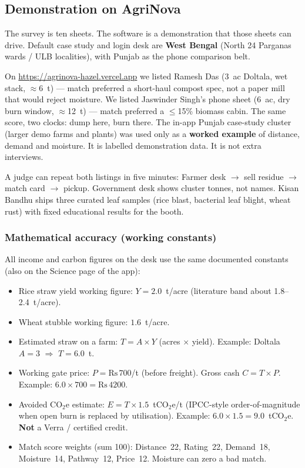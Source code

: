 \documentclass[12pt,a4paper]{article}
\begin{document}
\subsection{Demonstration on AgriNova}
The survey is ten sheets. The software is a demonstration that those sheets can drive. Default case study and login desk are \textbf{West Bengal} (North 24 Parganas wards / ULB localities), with Punjab as the phone comparison belt.

On \url{https://agrinova-hazel.vercel.app} we listed Ramesh Das (3~ac Doltala, wet stack, $\approx$6~t) --- match preferred a short-haul compost spec, not a paper mill that would reject moisture. We listed Jaswinder Singh's phone sheet (6~ac, dry burn window, $\approx$12~t) --- match preferred a $\le$15\% biomass cabin. The same score, two clocks: dump here, burn there. The in-app Punjab case-study cluster (larger demo farms and plants) was used only as a \textbf{worked example} of distance, demand and moisture. It is labelled demonstration data. It is not extra interviews.

A judge can repeat both listings in five minutes: Farmer desk $\rightarrow$ sell residue $\rightarrow$ match card $\rightarrow$ pickup. Government desk shows cluster tonnes, not names. Kisan Bandhu ships three curated leaf samples (rice blast, bacterial leaf blight, wheat rust) with fixed educational results for the booth.

\subsubsection{Mathematical accuracy (working constants)}
All income and carbon figures on the desk use the same documented constants (also on the Science page of the app):

\begin{itemize}
  \item Rice straw yield working figure: $Y = 2.0$~t/acre (literature band about 1.8--2.4~t/acre).
  \item Wheat stubble working figure: $1.6$~t/acre.
  \item Estimated straw on a farm: $T = A \times Y$ (acres $\times$ yield). Example: Doltala $A=3$ $\Rightarrow$ $T=6.0$~t.
  \item Working gate price: $P = \mathrm{Rs}\,700$/t (before freight). Gross cash $C = T \times P$. Example: $6.0 \times 700 = \mathrm{Rs}\,4200$.
  \item Avoided CO$_2$e estimate: $E = T \times 1.5$~tCO$_2$e/t (IPCC-style order-of-magnitude when open burn is replaced by utilisation). Example: $6.0 \times 1.5 = 9.0$~tCO$_2$e. \textbf{Not} a Verra / certified credit.
  \item Match score weights (sum 100): Distance~22, Rating~22, Demand~18, Moisture~14, Pathway~12, Price~12. Moisture can zero a bad match.
\end{itemize}
\end{document}
